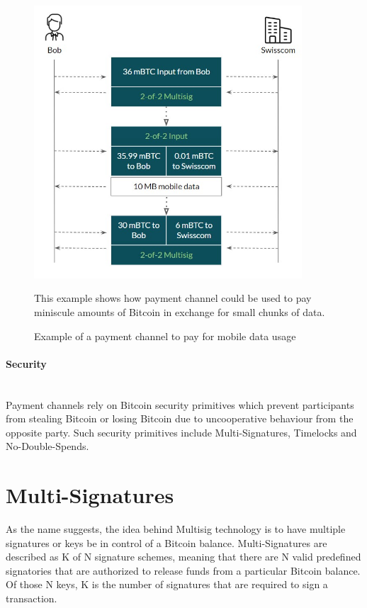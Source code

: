 \documentclass[a4paper, 12pt]{report}
\begin{document}
\begin{figure}[H]
	\centering
	\includegraphics[width=10cm]{07_Onedirectional_Channel}
	\caption{Example of a payment channel to pay for mobile data usage}
	\medskip
	\small This example shows how payment channel could be used to pay miniscule amounts of Bitcoin in exchange for small chunks of data.
	\label{fig:07_Onedirectional_Channel}
\end{figure}

\paragraph{Security} \hspace{0pt} \\
Payment channels rely on Bitcoin security primitives which prevent participants from stealing Bitcoin or losing Bitcoin due to uncooperative behaviour from the opposite party. Such security primitives include Multi-Signatures, Timelocks and No-Double-Spends.

\section{Multi-Signatures}

\par As the name suggests, the idea behind Multisig technology is to have multiple signatures or keys be in control of a Bitcoin balance. Multi-Signatures are described as K of N signature schemes, meaning that there are N valid predefined signatories that are authorized to release funds from a particular Bitcoin balance. Of those N keys, K is the number of signatures that are required to sign a transaction.
\end{document}
